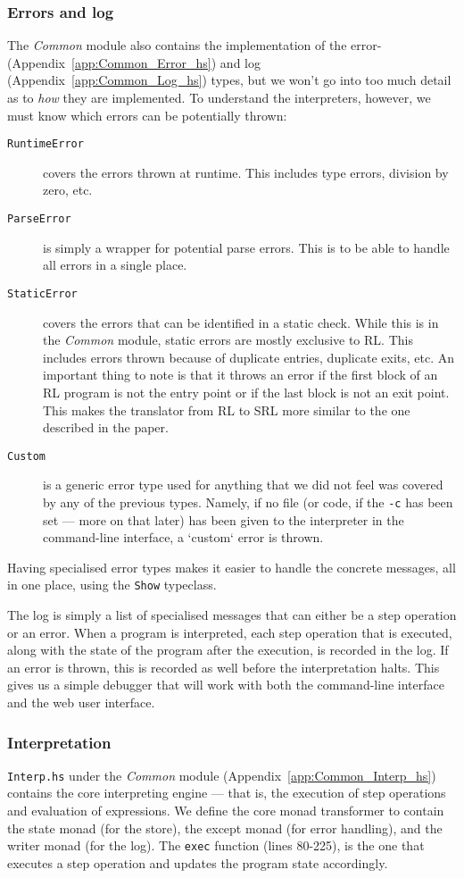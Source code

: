 \subsubsection{Errors and log}
The \textit{Common} module also contains the implementation of the error- (Appendix~\ref{app:Common_Error_hs}) and log (Appendix~\ref{app:Common_Log_hs}) types, but we won't go into too much detail as to \textit{how} they are implemented. To understand the interpreters, however, we must know which errors can be potentially thrown:
\begin{description}
  \item[\texttt{RuntimeError}] covers the errors thrown at runtime. This includes type errors, division by zero, etc.
  \item[\texttt{ParseError}] is simply a wrapper for potential parse errors. This is to be able to handle all errors in a single place.
  \item[\texttt{StaticError}] covers the errors that can be identified in a static check. While this is in the \textit{Common} module, static errors are mostly exclusive to RL. This includes errors thrown because of duplicate entries, duplicate exits, etc. An important thing to note is that it throws an error if the first block of an RL program is not the entry point or if the last block is not an exit point. This makes the translator from RL to SRL more similar to the one described in the paper.
  \item[\texttt{Custom}] is a generic error type used for anything that we did not feel was covered by any of the previous types. Namely, if no file (or code, if the \texttt{-c} has been set --- more on that later) has been given to the interpreter in the command-line interface, a `custom` error is thrown.
\end{description}
Having specialised error types makes it easier to handle the concrete messages, all in one place, using the \texttt{Show} typeclass.

The log is simply a list of specialised messages that can either be a step operation or an error. When a program is interpreted, each step operation that is executed, along with the state of the program after the execution, is recorded in the log. If an error is thrown, this is recorded as well before the interpretation halts. This gives us a simple debugger that will work with both the command-line interface and the web user interface.

\subsubsection{Interpretation}
\texttt{Interp.hs} under the \textit{Common} module (Appendix~\ref{app:Common_Interp_hs}) contains the core interpreting engine --- that is, the execution of step operations and evaluation of expressions. We define the core monad transformer to contain the state monad (for the store), the except monad (for error handling), and the writer monad (for the log). The \texttt{exec} function (lines 80-225), is the one that executes a step operation and updates the program state accordingly.


